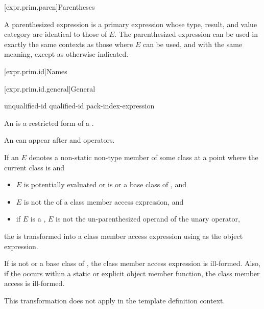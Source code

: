 [expr.prim.paren]{Parentheses}

\pnum
{}%
A parenthesized expression 
is a primary expression whose type, result, and value category are identical to those of $E$.
The parenthesized expression can be used in exactly the same contexts as
those where $E$ can be used, and with the same
meaning, except as otherwise indicated.

[expr.prim.id]{Names}

[expr.prim.id.general]{General}

\begin{bnf}
\br
    unqualified-id\br
    qualified-id\br
    pack-index-expression
\end{bnf}

\pnum
{}%
%
An  is a restricted form of a
.
\begin{note}
An  can appear after  and \tcode{->}
operators.
\end{note}

\pnum
If an  $E$ denotes
a non-static non-type member of some class  at a point where
the current class is  and
\begin{itemize}
\item
$E$ is potentially evaluated or
 is  or a base class of , and
\item
$E$ is not the  of
a class member access expression, and
\item
if $E$ is a ,
$E$ is not the un-parenthesized operand of
the unary \tcode{\&} operator,
\end{itemize}
the  is transformed into
a class member access expression using  as the object expression.
\begin{note}
If  is not  or a base class of ,
the class member access expression is ill-formed.
Also, if the  occurs within
a static or explicit object member function,
the class member access is ill-formed.
\end{note}
This transformation does not apply in
the template definition context.


